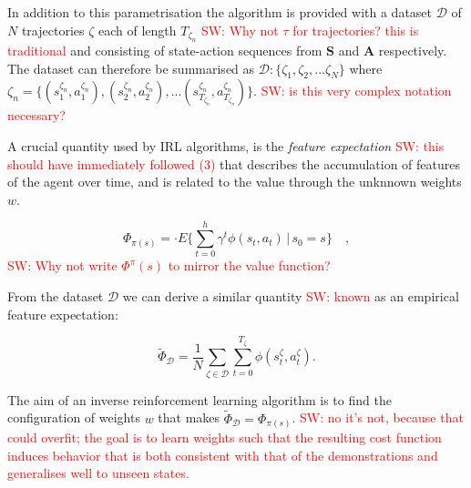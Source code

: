 \documentclass[letterpaper]{article}
\newcommand{\sw}[1]{\textcolor{red}{SW: #1}}
\begin{document}
In addition to this parametrisation the algorithm is provided with a dataset ${\mathcal{D}}$ of $N$ trajectories $\zeta$ each of length $T_{\zeta_n}$ \sw{Why not $\tau$ for trajectories? this is traditional} and consisting of state-action sequences from $\mathbf{S}$ and $\mathbf{A}$ respectively. The dataset can therefore be summarised as $\mathcal{D}:\big\{ \zeta_1,\zeta_2,...\zeta_N \big\}$ where $\zeta_n = \{(s^{\zeta_n}_1,a^{\zeta_n}_1),(s^{\zeta_n}_2,a^{\zeta_n}_2),...(s^{\zeta_n}_{T_{\zeta_n}},a^{\zeta_n}_{T_{\zeta_n}})\}$. \sw{is this very complex notation necessary?}

A crucial quantity used by IRL algorithms, is the \emph{feature expectation} \sw{this should have immediately followed (3)} that describes the accumulation of features of the agent over time, and is related to the value through the unknnown weights $w$. 

\begin{equation}
 	\Phi_{\pi(s)} = \cdot E\{\sum_{t = 0}^h \gamma^t\phi(s_t,a_t)\,\vert\, s_0 = s\}\quad, \label{eqn:model_fe}
\end{equation}
\sw{Why not write $\Phi^\pi(s)$ to mirror the value function?}

From the dataset ${\mathcal{D}}$ we can derive a similar quantity \sw{known} as an empirical feature expectation:

\begin{equation}
	\widetilde{\Phi}_{\mathcal{D}} =\frac{1}{N}\sum_{\zeta\in\mathcal{D}}\sum_{t=0}^{T_{\zeta}}\phi(s^\zeta_t,a^\zeta_t). \label{eqn:empirical_fe}
\end{equation}

The aim of an inverse reinforcement learning algorithm is to find the configuration of weights $w$ that makes $\widetilde{\Phi}_{\mathcal{D}} = \Phi_{\pi(s)}$. \sw{no it's not, because that could overfit; the goal is to learn weights such that the resulting cost function induces behavior that is both consistent with that of the demonstrations and generalises well to unseen states.}
\end{document}
